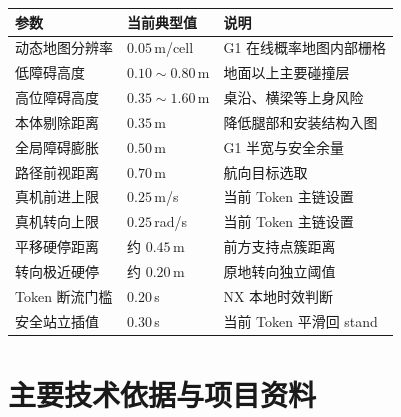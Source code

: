 \documentclass[11pt,a4paper,fontset=none]{ctexart}
\begin{document}
\begin{tabularx}{\textwidth}{p{3.5cm} p{2.5cm} X}
\toprule
参数 & 当前典型值 & 说明 \\
\midrule
动态地图分辨率 & $0.05\,$m/cell & G1 在线概率地图内部栅格 \\
低障碍高度 & $0.10\sim0.80\,$m & 地面以上主要碰撞层 \\
高位障碍高度 & $0.35\sim1.60\,$m & 桌沿、横梁等上身风险 \\
本体剔除距离 & $0.35\,$m & 降低腿部和安装结构入图 \\
全局障碍膨胀 & $0.50\,$m & G1 半宽与安全余量 \\
路径前视距离 & $0.70\,$m & 航向目标选取 \\
真机前进上限 & $0.25\,$m/s & 当前 Token 主链设置 \\
真机转向上限 & $0.25\,$rad/s & 当前 Token 主链设置 \\
平移硬停距离 & 约 $0.45\,$m & 前方支持点簇距离 \\
转向极近硬停 & 约 $0.20\,$m & 原地转向独立阈值 \\
Token 断流门槛 & $0.20\,$s & NX 本地时效判断 \\
安全站立插值 & $0.30\,$s & 当前 Token 平滑回 stand \\
\bottomrule
\end{tabularx}

\section{主要技术依据与项目资料}
\end{document}
